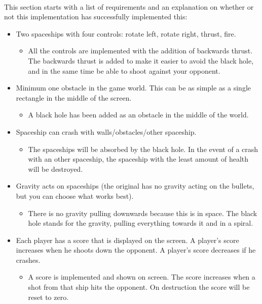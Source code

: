 \documentclass{article}
\begin{document}
\paragraph{}
This section starts with a list of requirements and an explanation on whether or not this implementation has successfully implemented this:
\begin{itemize}
	\item Two spaceships with four controls: rotate left, rotate right, thrust, fire.
	\begin{itemize}
		\item All the controls are implemented with the addition of backwards thrust. The backwards thrust is added to make it easier to avoid the black hole, and in the same time be able to shoot against your opponent.
	\end{itemize}
	\item Minimum one obstacle in the game world. This can be as simple as a single rectangle in the middle of the screen.
	\begin{itemize}
		\item A black hole has been added as an obstacle in the middle of the world.
	\end{itemize}
	\item Spaceship can crash with walls/obstacles/other spaceship.
	\begin{itemize}
		\item The spaceships will be absorbed by the black hole. In the event of a crash with an other spaceship, the spaceship with the least amount of health will be destroyed.
	\end{itemize}
	\item Gravity acts on spaceships (the original has no gravity acting on the
	bullets, but you can choose what works best).
	\begin{itemize}
		\item There is no gravity pulling downwards because this is in space. The black hole stands for the gravity, pulling everything towards it and in a spiral.
	\end{itemize}
	\item Each player has a score that is displayed on the screen. A player's score increases when he shoots down the opponent. A player's score decreases if he crashes.
	\begin{itemize}
		\item A score is implemented and shown on screen. The score increases when a shot from that ship hits the opponent. On destruction the score will be reset to zero.

\end{itemize}
\end{itemize}
\end{document}
